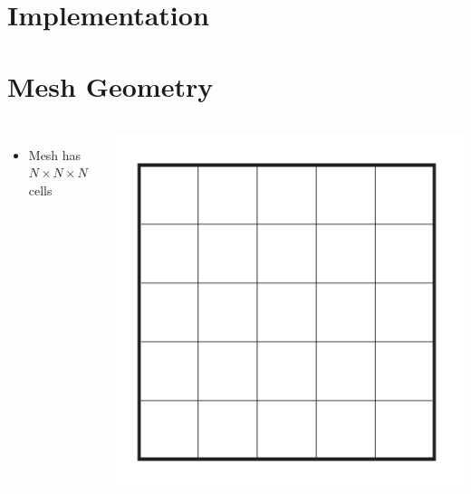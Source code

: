\documentclass{beamer}
\begin{document}
\section{Implementation}
\section{Mesh Geometry}
\begin{frame}
\begin{columns}[c]
\begin{itemize}
    \item Mesh has $N\times N \times N$ cells
\end{itemize}

    \includegraphics[width=\textwidth, keepaspectratio]{Mesh}
\end{columns}
\end{frame}
\end{document}
